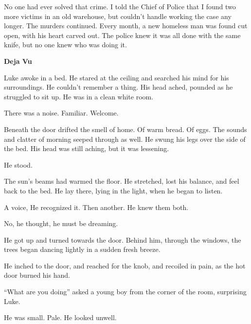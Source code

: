 No one had ever solved that crime. I told the Chief of Police that
I found two more victims in an old warehouse, but couldn't
handle working the case any longer. The murders continued. Every
month, a new homeless man was found cut open, with his heart carved
out. The police knew it was all done with the same knife, but no
one knew who was doing it. 
 



%
%
%
%
%
%
%
%
% 
%
%
%

{\bf Deja Vu}



Luke awoke in a bed. He stared at the ceiling and searched his mind
for his surroundings. He couldn't remember a thing. His head
ached, pounded as he struggled to sit up. He was in a clean white
room.

There was a noise. Familiar. Welcome.

Beneath the door drifted the smell of home. Of warm bread. Of eggs.
The sounds and clatter of morning seeped through as well. He swung
his legs over the side of the bed. His head was still aching, but
it was lessening.

He stood.

The sun's beams had warmed the floor. He stretched, lost his
balance, and feel back to the bed. He lay there, lying in the
light, when he began to listen.

A voice, He recognized it. Then another. He knew them both.

No, he thought, he must be dreaming.

He got up and turned towards the door. Behind him, through the
windows, the trees began dancing lightly in a sudden fresh
breeze.

He inched to the door, and reached for the knob, and recoiled in
pain, as the hot door burned his hand.

``What are you doing'' asked a young boy from the corner
of the room, surprising Luke.

He was small. Pale. He looked unwell.

